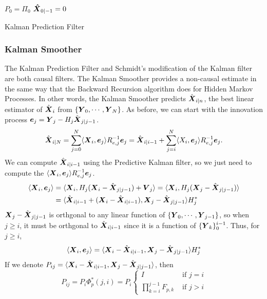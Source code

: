 \begin{algorithm}[H]
	\SetAlgoLined
	$P_0 = \Pi_0$\;
	$\boldsymbol{\hat{X}}_{0|-1} = 0$\;
	\caption{Kalman Prediction Filter}
\end{algorithm}
\subsubsection{Kalman Smoother}
The Kalman Prediction Filter and Schmidt's modification of the Kalman filter are both causal filters.
The Kalman Smoother provides a non-causal estimate in the same way that the Backward Recursion algorithm does for Hidden Markov Processes.
In other words, the Kalman Smoother predicts $\hat{\boldsymbol{X}}_{i|n}$, the best linear estimator of $\hat{\boldsymbol{X}}_i$ from $\{\boldsymbol{Y}_0, \cdots, \boldsymbol{Y}_N\}$.
As before, we can start with the innovation process $\boldsymbol{e}_j = \boldsymbol{Y}_j - H_j\hat{\boldsymbol{X}}_{j|j-1}$.
\[
	\hat{\boldsymbol{X}}_{i|N} = \sum_{j=0}^N \langle \boldsymbol{X}_i, \boldsymbol{e}_j \rangle R_{e,j}^{-1}\boldsymbol{e}_j = \hat{\boldsymbol{X}}_{i|i-1} + \sum_{j=i}^N \langle X_i, \boldsymbol{e}_j \rangle R_{e,j}^{-1}\boldsymbol{e}_j.
\]
We can compute $\hat{\boldsymbol{X}}_{i|i-1}$ using the Predictive Kalman filter, so we just need to compute the $\langle \boldsymbol{X}_i, \boldsymbol{e}_j \rangle R_{e,j}^{-1}\boldsymbol{e}_j$.
\begin{align*}
	\langle \boldsymbol{X}_i, \boldsymbol{e}_j \rangle &= \langle \boldsymbol{X}_i, H_j(\boldsymbol{X}_i - \hat{\boldsymbol{X}}_{j|j-1}) + \boldsymbol{V}_j \rangle = \langle \boldsymbol{X}_i, H_j(\boldsymbol{X}_j - \hat{\boldsymbol{X}}_{j|j-1}) \rangle \\
	&= \langle \hat{\boldsymbol{X}}_{i|i-1} + (\boldsymbol{X}_i - \hat{\boldsymbol{X}}_{i|i-1}), \boldsymbol{X}_j - \hat{\boldsymbol{X}}_{j|j-1} \rangle H_j^*
\end{align*}
$\boldsymbol{X}_j - \hat{\boldsymbol{X}}_{j|j-1}$ is orthgonal to any linear function of $\{\boldsymbol{Y}_0, \cdots, \boldsymbol{Y}_{j-1}\}$, so when $j \geq i$, it must be orthgonal to $\hat{\boldsymbol{X}}_{i|i-1}$ since it is a function of $\{\boldsymbol{Y}_k\}^{i-1}_0$.
Thus, for $j\geq i$, \[
	\langle \boldsymbol{X}_i, \boldsymbol{e}_j \rangle = \langle \boldsymbol{X}_i - \hat{\boldsymbol{X}}_{i|i-1}, \boldsymbol{X}_j - \hat{\boldsymbol{X}}_{j|j-1} \rangle H_j^*
\]
If we denote $P_{ij} = \langle \boldsymbol{X}_i - \hat{\boldsymbol{X}}_{i|i-1}, \boldsymbol{X}_j - \hat{\boldsymbol{X}}_{j|j-1} \rangle$, then \[
	P_{ij} = P_{i}\Phi_{p}^*(j, i) = P_{i} \begin{cases} I & \text{ if } j =  i\\ \prod_{k=i}^{j-1} F_{p,k} & \text{ if } j > i \end{cases}
\]
